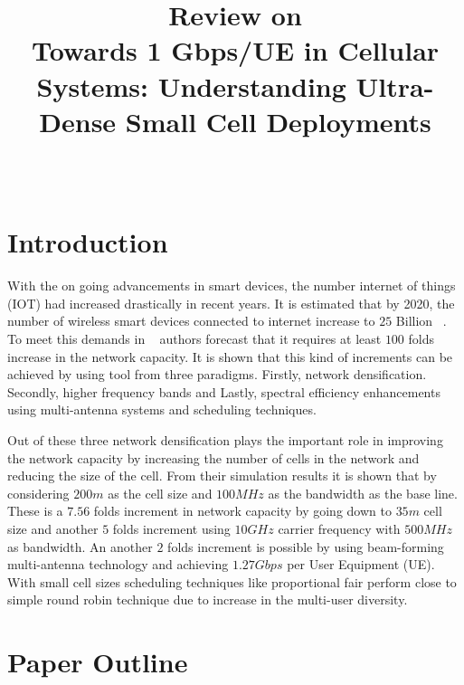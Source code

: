 \documentclass[12pt,onecolumn]{IEEEtran}
\begin{document}
\title{Review on \\ Towards 1 Gbps/UE in Cellular Systems: Understanding Ultra-Dense Small Cell Deployments}
\author{\\
}
\maketitle



\section{Introduction}
\label{sec:intro}

With the on going advancements in smart devices, the number internet of things (IOT) had increased drastically in recent years. It is estimated that by 2020, the number of wireless smart devices connected to internet increase to $25$ Billion ~\cite{Gartner}. To meet this demands in ~\cite{main_paper} authors forecast that it requires at least $100$ folds increase in the network capacity. It is shown that this kind of increments can be achieved by using tool from three paradigms. Firstly, network densification. Secondly, higher frequency bands and Lastly, spectral efficiency enhancements using multi-antenna systems and scheduling techniques. 

Out of these three network densification plays the important role in improving the network capacity by increasing the number of cells in the network and reducing the size of the cell. From their simulation results it is shown that by considering $200m$ as the cell size and $100MHz$ as the bandwidth as the base line. These is a $7.56$ folds increment in network capacity by going down to $35m$ cell size and another $5$ folds increment using $10GHz$ carrier frequency with $500MHz$ as bandwidth. An another $2$ folds increment is possible by using beam-forming multi-antenna technology and achieving $1.27Gbps$ per User Equipment (UE). With small cell sizes scheduling techniques like proportional fair perform close to simple round robin technique due to increase in the multi-user diversity.

\section{Paper Outline}
\label{sec:PO}
\end{document}
